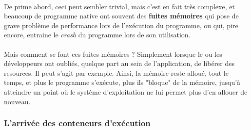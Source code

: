 {  \paragraph{} De prime abord, ceci peut sembler trivial, mais c'est en fait très complexe, et
  beaucoup de programme native ont souvent des \textbf{fuites mémoires} qui pose de grave problème
  de performance lors de l'exécution du programme, ou qui, pire encore, entraine le \textit{crash} du
  programme lors de son utilisation.

  \paragraph{} Mais comment se font ces fuites mémoires ? Simplement lorsque le ou les développeurs
  ont oubliés, quelque part au sein de l'application, de libérer des resources. Il peut s'agit par
  exemple. Ainsi, la mémoire reste alloué, tout le temps, et plus le programme s'exécute, plus ils
  "bloque" de la mémoire, jusqu'à atteindre un point où le système d'exploitation ne lui permet plus
  d'en allouer de nouveau.

}

\subsubsection{L'arrivée des conteneurs d'exécution}

